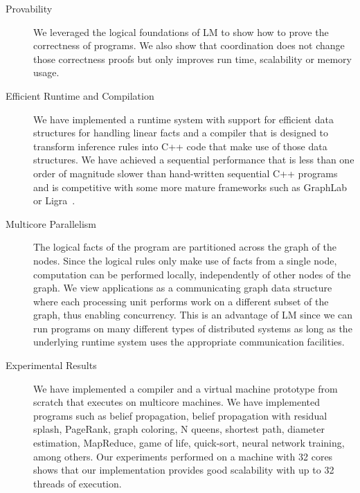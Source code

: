 \begin{description}
   \item[Provability]
   
   We leveraged the logical foundations of LM to show how to prove the correctness
   of programs. We also show that coordination does not change those
   correctness proofs but only improves run time, scalability or memory usage.

\item[Efficient Runtime and Compilation]

   We have implemented a runtime system with support for efficient data
   structures for handling linear facts and a compiler that is designed to
   transform inference rules into C++ code that make use of those data
   structures. We have achieved a sequential performance that is less than one
   order of magnitude slower than hand-written sequential C++ programs and is
   competitive with some more mature frameworks such as
   GraphLab~\cite{GraphLab2010} or Ligra~\cite{Shun:2013:LLG:2517327.2442530}.

\item[Multicore Parallelism]
   
   The logical facts of the program are partitioned across the graph of the
   nodes. Since the logical rules only make use of facts from a single node,
   computation can be performed locally, independently of other nodes of the
   graph. We view applications as a communicating graph data structure where
   each processing unit performs work on a different subset of the graph, thus
   enabling concurrency. This is an advantage of LM since we can run programs on
   many different types of distributed systems as long as the underlying runtime
   system uses the appropriate communication facilities.

\item[Experimental Results]

   We have implemented a compiler and a virtual machine prototype from scratch
   that executes on multicore machines.  We have implemented programs such as
   belief propagation, belief propagation with residual splash, PageRank, graph
   coloring, N queens, shortest path, diameter estimation, MapReduce, game of
   life, quick-sort, neural network training, among others. Our experiments
   performed on a machine with 32 cores shows that our implementation provides
   good scalability with up to 32 threads of execution.
   
\end{description}
